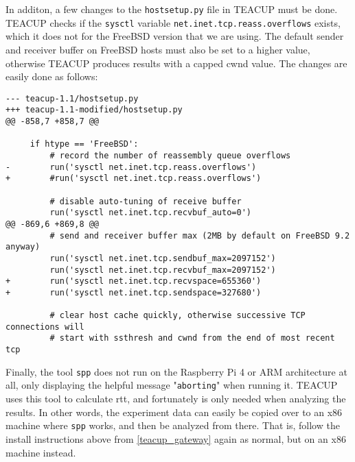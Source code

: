 
In additon, a few changes to the \lstinline{hostsetup.py} file in TEACUP must be done. TEACUP checks if the \lstinline{sysctl} variable \lstinline{net.inet.tcp.reass.overflows} exists, which it does not for the FreeBSD version that we are using. The default sender and receiver buffer on FreeBSD hosts must also be set to a higher value, otherwise TEACUP produces results with a capped \gls{cwnd} value. The changes are easily done as follows:

\begin{verbatim}
--- teacup-1.1/hostsetup.py
+++ teacup-1.1-modified/hostsetup.py
@@ -858,7 +858,7 @@
 
     if htype == 'FreeBSD':
         # record the number of reassembly queue overflows
-        run('sysctl net.inet.tcp.reass.overflows')
+        #run('sysctl net.inet.tcp.reass.overflows')
 
         # disable auto-tuning of receive buffer
         run('sysctl net.inet.tcp.recvbuf_auto=0')
@@ -869,6 +869,8 @@
         # send and receiver buffer max (2MB by default on FreeBSD 9.2 anyway)
         run('sysctl net.inet.tcp.sendbuf_max=2097152')
         run('sysctl net.inet.tcp.recvbuf_max=2097152')
+        run('sysctl net.inet.tcp.recvspace=655360')
+        run('sysctl net.inet.tcp.sendspace=327680')
 
         # clear host cache quickly, otherwise successive TCP connections will
         # start with ssthresh and cwnd from the end of most recent tcp
\end{verbatim}

Finally, the tool \lstinline{spp} does not run on the Raspberry Pi 4 or ARM architecture at all, only displaying the helpful message "\lstinline{aborting}" when running it. TEACUP uses this tool to calculate \gls{rtt}, and fortunately is only needed when analyzing the results. In other words, the experiment data can easily be copied over to an x86 machine where \lstinline{spp} works, and then be analyzed from there. That is, follow the install instructions above from \ref{teacup_gateway} again as normal, but on an x86 machine instead.